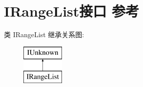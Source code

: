 \hypertarget{interface_i_range_list}{}\section{I\+Range\+List接口 参考}
\label{interface_i_range_list}
类 I\+Range\+List 继承关系图\+:\begin{figure}[H]
\begin{center}
\leavevmode
\includegraphics[height=2.000000cm]{interface_i_range_list}
\end{center}
\end{figure}
